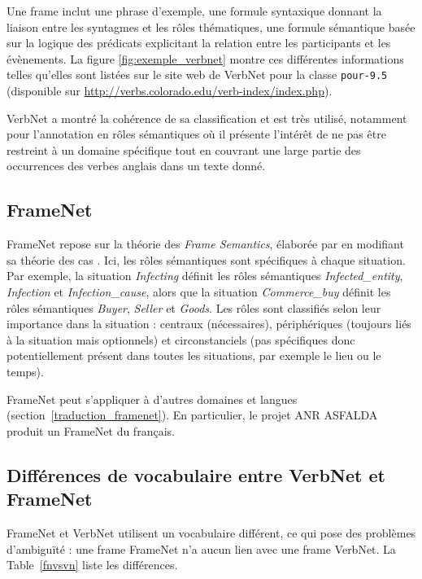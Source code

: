 Une frame inclut une phrase d'exemple, une formule syntaxique donnant la
liaison entre les syntagmes et les rôles thématiques, une formule sémantique
basée sur la logique des prédicats explicitant la relation entre les
participants et les évènements. La figure \ref{fig:exemple_verbnet} montre ces
différentes informations telles qu'elles sont listées sur le site web de
VerbNet pour la classe \texttt{pour-9.5} (disponible sur
\url{http://verbs.colorado.edu/verb-index/index.php}).

VerbNet a montré la cohérence de sa classification et est très utilisé,
notamment pour l'annotation en rôles sémantiques
\citep{swier2005exploiting,palmer2013semantic} où il présente l'intérêt de ne
pas être restreint à un domaine spécifique tout en couvrant une large partie
des occurrences des verbes anglais dans un texte donné.

\subsection{FrameNet}
\label{presentation_framenet}

FrameNet \citep{baker1998berkeley} repose sur la théorie des \textit{Frame
Semantics}, élaborée par \cite{fillmore1982frame} en modifiant sa théorie des
cas \citep{fillmore1968case}. Ici, les rôles sémantiques sont spécifiques à
chaque situation. Par exemple, la situation \textit{Infecting} définit les rôles
sémantiques \textit{Infected\_entity}, \textit{Infection} et
\textit{Infection\_cause}, alors que la situation \textit{Commerce\_buy} définit les
rôles sémantiques \textit{Buyer}, \textit{Seller} et \textit{Goods}. Les rôles sont
classifiés selon leur importance dans la situation : centraux (nécessaires),
périphériques (toujours liés à la situation mais optionnels) et circonstanciels
(pas spécifiques donc potentiellement présent dans toutes les situations, par
exemple le lieu ou le temps).

FrameNet peut s'appliquer à d'autres domaines et langues
(section~\ref{traduction_framenet}). En particulier, le projet ANR ASFALDA
produit un FrameNet du français.

\subsection{Différences de vocabulaire entre VerbNet et FrameNet}
\label{vocverbnetframenet}

FrameNet et VerbNet utilisent un vocabulaire différent, ce qui pose des
problèmes d'ambiguïté : une frame FrameNet n'a aucun lien avec une frame
VerbNet. La Table~\ref{fnvsvn} liste les différences.

